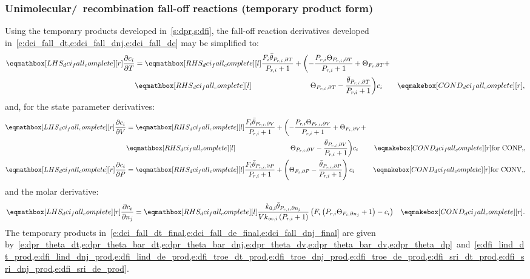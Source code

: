 \documentclass[12pt,number,sort&compress]{elsarticle}
\begin{document}
\subsubsection{Unimolecular\slash~recombination fall-off reactions (temporary product form)}
\label{s:dfall_final}
Using the temporary products developed in~\cref{s:dpr,s:dfi}, the fall-off reaction derivatives developed in~\cref{e:dci_fall_dt,e:dci_fall_dnj,e:dci_fall_de} may be simplified to:
\begin{align}
\label{e:dci_fall_dt_final}
\lhs{dci_fall_complete}{\frac{\partial c_{i}}{\partial T }} &= \rhs{dci_fall_complete}{\frac{F_{i} \bar{\theta}_{P_{r, i}, \partial T}}{P_{r, i} + 1} + \biggl(- \frac{P_{r, i} \Theta_{P_{r,i}, \partial T}}{P_{r, i} + 1} + \Theta_{F_i, \partial T} + } & \nonumber \\
							     &  \rhs{dci_fall_complete}{\mathindent[largerindentpleas] \Theta_{P_{r,i}, \partial T} - \frac{\bar{\theta}_{P_{r, i}, \partial T}}{P_{r, i} + 1}\biggr) c_{i}} & \cond{dci_fall_complete}{,}
\end{align}
and, for the state parameter derivatives:
\begin{subequations}
 \label{e:dci_fall_de_final}
 \begin{align}
  \lhs{dci_fall_complete}{\frac{\partial c_{i}}{\partial V }} &= \rhs{dci_fall_complete}{\frac{F_{i} \bar{\theta}_{P_{r, i}, \partial V}}{P_{r, i} + 1} + \biggl(- \frac{P_{r, i} \Theta_{P_{r,i}, \partial V}}{P_{r, i} + 1} + \Theta_{F_i, \partial V} + } & \nonumber \\
							       &  \rhs{dci_fall_complete}{\mathindent[largerindentpleas] \Theta_{P_{r,i}, \partial V} - \frac{\bar{\theta}_{P_{r, i}, \partial V}}{P_{r, i} + 1} \biggr) c_{i}} & \cond{dci_fall_complete}{\dconp/,} \\
  \lhs{dci_fall_complete}{\frac{\partial c_{i}}{\partial P }} &= \rhs{dci_fall_complete}{\frac{F_{i} \bar{\theta}_{P_{r, i}, \partial P}}{P_{r, i} + 1} + \left(\Theta_{F_i, \partial P} - \frac{\bar{\theta}_{P_{r, i}, \partial P}}{P_{r, i} + 1}\right) c_{i}} & \cond{dci_fall_complete}{\dconv/,}
 \end{align}
\end{subequations}
and the molar derivative:
\begin{align}
 \label{e:dci_fall_dnj_final}
\lhs{dci_fall_complete}{\frac{\partial c_{i} }{\partial {n_j} }} &= \rhs{dci_fall_complete}{\frac{k_{0, i} \bar{\theta}_{P_{r, i}, \partial n_j}}{V k_{\infty, i} \left(P_{r, i} + 1\right)} \left(F_{i} \left(P_{r, i} \Theta_{F_i, \partial n_j} + 1\right) - c_{i}\right)} & \cond{dci_fall_complete}{.}
\end{align}
The temporary products in~\cref{e:dci_fall_dt_final,e:dci_fall_de_final,e:dci_fall_dnj_final} are given by~\cref{e:dpr_theta_dt,e:dpr_theta_bar_dt,e:dpr_theta_bar_dnj,e:dpr_theta_dv,e:dpr_theta_bar_dv,e:dpr_theta_dp}~and~\cref{e:dfi_lind_dt_prod,e:dfi_lind_dnj_prod,e:dfi_lind_de_prod,e:dfi_troe_dt_prod,e:dfi_troe_dnj_prod,e:dfi_troe_de_prod,e:dfi_sri_dt_prod,e:dfi_sri_dnj_prod,e:dfi_sri_de_prod}.
\end{document}
